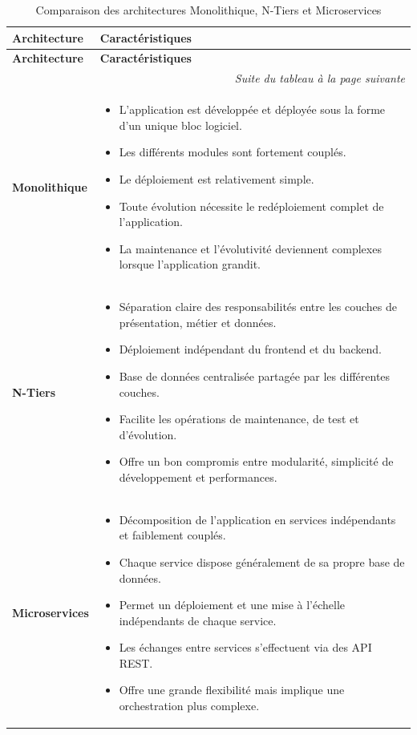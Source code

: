 \begin{longtable}{|p{3.3cm}|>{\raggedright\arraybackslash}p{10.9cm}|}
\hline
\textbf{Architecture} & \textbf{Caractéristiques} \\
\hline
\endfirsthead

\hline
\textbf{Architecture} & \textbf{Caractéristiques} \\
\hline
\endhead

\hline
\multicolumn{2}{r}{\textit{Suite du tableau à la page suivante}} \\
\endfoot

\hline
\caption{Comparaison des architectures Monolithique, N-Tiers et Microservices}
\label{tab:comparaison-archi}
\endlastfoot

\textbf{Monolithique} &
\begin{itemize}[leftmargin=*, nosep]
  \item L'application est développée et déployée sous la forme d'un unique bloc logiciel.
  \item Les différents modules sont fortement couplés.
  \item Le déploiement est relativement simple.
  \item Toute évolution nécessite le redéploiement complet de l'application.
  \item La maintenance et l'évolutivité deviennent complexes lorsque l'application
        grandit.
\end{itemize} \\
\hline

\textbf{N-Tiers} &
\begin{itemize}[leftmargin=*, nosep]
  \item Séparation claire des responsabilités entre les couches de présentation, métier
        et données.
  \item Déploiement indépendant du frontend et du backend.
  \item Base de données centralisée partagée par les différentes couches.
  \item Facilite les opérations de maintenance, de test et d'évolution.
  \item Offre un bon compromis entre modularité, simplicité de développement et
        performances.
\end{itemize} \\
\hline

\textbf{Microservices} &
\begin{itemize}[leftmargin=*, nosep]
  \item Décomposition de l'application en services indépendants et faiblement couplés.
  \item Chaque service dispose généralement de sa propre base de données.
  \item Permet un déploiement et une mise à l'échelle indépendants de chaque service.
  \item Les échanges entre services s'effectuent via des API REST.
  \item Offre une grande flexibilité mais implique une orchestration plus complexe.
\end{itemize} \\
\hline

\end{longtable}

